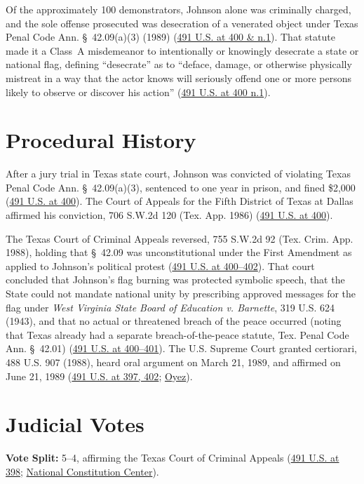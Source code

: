 \documentclass[12pt]{article}
\begin{document}
Of the approximately 100 demonstrators, Johnson alone was criminally charged, and the sole offense prosecuted was desecration of a venerated object under Texas Penal Code Ann. \S~42.09(a)(3) (1989) (\href{https://supreme.justia.com/cases/federal/us/491/397/}{491 U.S. at 400 \& n.1}). That statute made it a Class~A misdemeanor to intentionally or knowingly desecrate a state or national flag, defining ``desecrate'' as to ``deface, damage, or otherwise physically mistreat in a way that the actor knows will seriously offend one or more persons likely to observe or discover his action'' (\href{https://supreme.justia.com/cases/federal/us/491/397/}{491 U.S. at 400 n.1}).

\section{Procedural History}
After a jury trial in Texas state court, Johnson was convicted of violating Texas Penal Code Ann. \S~42.09(a)(3), sentenced to one year in prison, and fined \$2,000 (\href{https://supreme.justia.com/cases/federal/us/491/397/}{491 U.S. at 400}). The Court of Appeals for the Fifth District of Texas at Dallas affirmed his conviction, 706 S.W.2d 120 (Tex. App. 1986) (\href{https://supreme.justia.com/cases/federal/us/491/397/}{491 U.S. at 400}).

The Texas Court of Criminal Appeals reversed, 755 S.W.2d 92 (Tex. Crim. App. 1988), holding that \S~42.09 was unconstitutional under the First Amendment as applied to Johnson's political protest (\href{https://supreme.justia.com/cases/federal/us/491/397/}{491 U.S. at 400--402}). That court concluded that Johnson's flag burning was protected symbolic speech, that the State could not mandate national unity by prescribing approved messages for the flag under \textit{West Virginia State Board of Education v. Barnette}, 319 U.S. 624 (1943), and that no actual or threatened breach of the peace occurred (noting that Texas already had a separate breach-of-the-peace statute, Tex. Penal Code Ann. \S~42.01) (\href{https://supreme.justia.com/cases/federal/us/491/397/}{491 U.S. at 400--401}). The U.S. Supreme Court granted certiorari, 488 U.S. 907 (1988), heard oral argument on March 21, 1989, and affirmed on June 21, 1989 (\href{https://supreme.justia.com/cases/federal/us/491/397/}{491 U.S. at 397, 402}; \href{https://www.oyez.org/cases/1988/88-155}{Oyez}).

\section{Judicial Votes}
\textbf{Vote Split:} 5--4, affirming the Texas Court of Criminal Appeals (\href{https://supreme.justia.com/cases/federal/us/491/397/}{491 U.S. at 398}; \href{https://constitutioncenter.org/the-constitution/supreme-court-case-library/texas-v-johnson}{National Constitution Center}).
\end{document}
